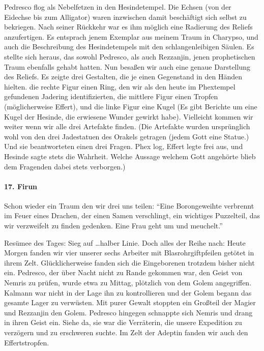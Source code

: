 Pedresco flog als Nebelfetzen in den Hesindetempel. Die Echsen (von der Eidechse bis zum Alligator) waren inzwischen damit beschäftigt sich selbst zu bekriegen. Nach seiner Rückkehr war es ihm möglich eine Radierung des Reliefs anzufertigen. Es entsprach jenem Exemplar aus meinem Traum in Charypso, und auch die Beschreibung des Hesindetempels mit den schlangenleibigen Säulen. Es stellte sich heraus, das sowohl Pedresco, als auch Rezzanjin, jenen prophetischen Traum ebenfalls gehabt hatten. Nun besaßen wir auch eine genaue Darstellung des Reliefs. Es zeigte drei Gestalten, die je einen Gegenstand in den Händen hielten. die rechte Figur einen Ring, den wir als den heute im Phextempel gefundenen Jadering identifizierten, die mittlere Figur einen Tropfen (möglicherweise Effert), und die linke Figur eine Kugel (Es gibt Berichte um eine Kugel der Hesinde, die erwiesene Wunder gewirkt habe). Vielleicht kommen wir weiter wenn wir alle drei Artefakte finden. (Die Artefakte wurden ursprünglich wohl von den drei Jadestatuen des Orakels getragen (jedem Gott eine Statue.) Und sie beantworteten einen drei Fragen. Phex log, Effert legte frei aus, und Hesinde sagte stets die Wahrheit. Welche Aussage welchem Gott angehörte blieb dem Fragenden dabei stets verborgen.)

\paragraph{17. Firun}
Schon wieder ein Traum den wir drei uns teilen: ``Eine Borongeweihte verbrennt im Feuer eines Drachen, der einen Samen verschlingt, ein wichtiges Puzzelteil, das wir verzweifelt zu finden gedenken. Eine Frau geht um und meuchelt.''

Resümee des Tages: Sieg auf \dots halber Linie. Doch alles der Reihe nach:
Heute Morgen fanden wir vier unserer sechs Arbeiter mit Blasrohrgiftpfeilen getötet in ihrem Zelt. Glücklicherweise fanden sich die Eingeborenen trotzdem bisher nicht ein.
Pedresco, der über Nacht nicht zu Rande gekommen war, den Geist von Nemris zu prüfen, wurde etwa zu Mittag, plötzlich von dem Golem angegriffen. Kalmann war nicht in der Lage ihn zu kontrollieren und der Golem begann das gesamte Lager zu verwüsten. Mit purer Gewalt stoppten ein Großteil der Magier und Rezzanjin den Golem. Pedresco hingegen schnappte sich Nemris und drang in ihren Geist ein. Siehe da, sie war die Verräterin, die unsere Expedition zu verzögern und zu erschweren suchte. Im Zelt der Adeptin fanden wir auch den Effertstropfen.

